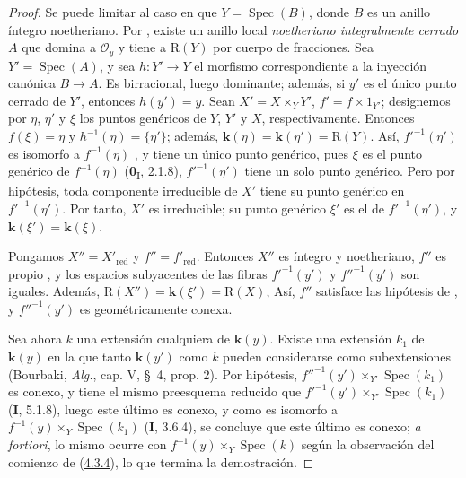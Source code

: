 \begin{proof}
Se puede limitar al caso en que $Y=\operatorname{Spec}(B)$, donde $B$ es un anillo
íntegro noetheriano. Por , existe un anillo local
\emph{noetheriano integralmente cerrado} $A$ que domina a $\mathcal O_y$ y tiene a
$\mathrm R(Y)$ por cuerpo de fracciones. Sea $Y'=\operatorname{Spec}(A)$, y
sea $h:Y'\to Y$ el morfismo correspondiente a la inyección canónica
$B\to A$. Es birracional, luego dominante; además, si $y'$ es el
único punto cerrado de $Y'$, entonces $h(y')=y$. Sean
$X'=X\times_YY'$, $f'=f\times1_{Y'}$; designemos por $\eta$, $\eta'$ y $\xi$ los puntos genéricos de $Y$, $Y'$ y
$X$, respectivamente. Entonces $f(\xi)=\eta$ y
$h^{-1}(\eta)=\{\eta'\}$; además,
$\boldsymbol{k}(\eta)=\boldsymbol{k}(\eta')=\mathrm R(Y)$. Así, $f'^{-1}(\eta')$ es
isomorfo a $f^{-1}(\eta)$ , y tiene un único punto
genérico, pues $\xi$ es el punto genérico de
$f^{-1}(\eta)$ (\textbf{0}\textsubscript{I}, 2.1.8),
$f'^{-1}(\eta')$ tiene un solo punto genérico. Pero por hipótesis, toda
componente irreducible de $X'$ tiene su punto genérico en
$f'^{-1}(\eta')$. Por tanto, $X'$ es irreducible; su punto genérico
$\xi'$ es el de $f'^{-1}(\eta')$, y
$\boldsymbol{k}(\xi')=\boldsymbol{k}(\xi)$.



Pongamos $X''=X'_{\mathrm{red}}$ y $f''=f'_{\mathrm{red}}$. Entonces
$X''$ es íntegro y noetheriano, $f''$ es propio
, y los espacios subyacentes de las fibras
$f'^{-1}(y')$ y $f''^{-1}(y')$ son iguales. Además,
$\mathrm R(X'')=\boldsymbol{k}(\xi')=\mathrm R(X)$,
Así, $f''$ satisface las hipótesis de , y
$f''^{-1}(y')$ es geométricamente conexa.

Sea ahora $k$ una extensión cualquiera de $\boldsymbol{k}(y)$. Existe una
extensión $k_1$ de $\boldsymbol{k}(y)$ en la que tanto $\boldsymbol{k}(y')$ como $k$ pueden considerarse como subextensiones (Bourbaki, \emph{Alg.}, cap. V, \S~4, prop. 2). Por hipótesis, $f''^{-1}(y')\times_{Y'}\operatorname{Spec}(k_1)$ es conexo, y tiene el mismo preesquema reducido que $f'^{-1}(y')\times_{Y'}\operatorname{Spec}(k_1)$ (\textbf{I}, 5.1.8), luego este último es conexo, y como es isomorfo a $f^{-1}(y)\times_Y\operatorname{Spec}(k_1)$ (\textbf{I}, 3.6.4), se concluye que este último es conexo; \emph{a fortiori}, lo mismo ocurre con $f^{-1}(y)\times_Y\operatorname{Spec}(k)$ según la observación del comienzo de (\hyperref[III.4.3.4-fr]{4.3.4}), lo que termina la demostración.
\end{proof}

